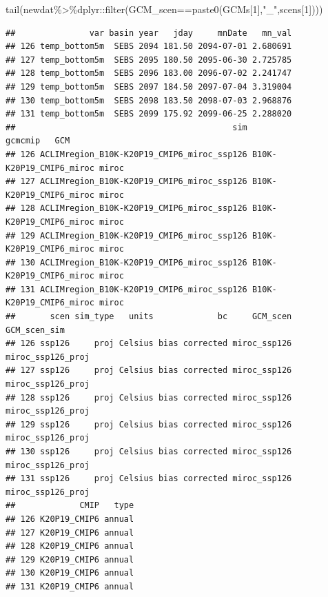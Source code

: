 \documentclass[
]{article}
\newenvironment{Shaded}{\begin{snugshade}}{\end{snugshade}}
\newcommand{\DecValTok}[1]{\textcolor[rgb]{0.00,0.00,0.81}{#1}}
\newcommand{\FunctionTok}[1]{\textcolor[rgb]{0.00,0.00,0.00}{#1}}
\newcommand{\NormalTok}[1]{#1}
\newcommand{\SpecialCharTok}[1]{\textcolor[rgb]{0.00,0.00,0.00}{#1}}
\newcommand{\StringTok}[1]{\textcolor[rgb]{0.31,0.60,0.02}{#1}}
\begin{document}
\begin{Shaded}
\begin{Highlighting}[]
\FunctionTok{tail}\NormalTok{(newdat}\SpecialCharTok{\%\textgreater{}\%}\NormalTok{dplyr}\SpecialCharTok{::}\FunctionTok{filter}\NormalTok{(GCM\_scen}\SpecialCharTok{==}\FunctionTok{paste0}\NormalTok{(GCMs[}\DecValTok{1}\NormalTok{],}\StringTok{"\_"}\NormalTok{,scens[}\DecValTok{1}\NormalTok{])))}
\end{Highlighting}
\end{Shaded}

\begin{verbatim}
##               var basin year   jday     mnDate   mn_val
## 126 temp_bottom5m  SEBS 2094 181.50 2094-07-01 2.680691
## 127 temp_bottom5m  SEBS 2095 180.50 2095-06-30 2.725785
## 128 temp_bottom5m  SEBS 2096 183.00 2096-07-02 2.241747
## 129 temp_bottom5m  SEBS 2097 184.50 2097-07-04 3.319004
## 130 temp_bottom5m  SEBS 2098 183.50 2098-07-03 2.968876
## 131 temp_bottom5m  SEBS 2099 175.92 2099-06-25 2.288020
##                                            sim                 gcmcmip   GCM
## 126 ACLIMregion_B10K-K20P19_CMIP6_miroc_ssp126 B10K-K20P19_CMIP6_miroc miroc
## 127 ACLIMregion_B10K-K20P19_CMIP6_miroc_ssp126 B10K-K20P19_CMIP6_miroc miroc
## 128 ACLIMregion_B10K-K20P19_CMIP6_miroc_ssp126 B10K-K20P19_CMIP6_miroc miroc
## 129 ACLIMregion_B10K-K20P19_CMIP6_miroc_ssp126 B10K-K20P19_CMIP6_miroc miroc
## 130 ACLIMregion_B10K-K20P19_CMIP6_miroc_ssp126 B10K-K20P19_CMIP6_miroc miroc
## 131 ACLIMregion_B10K-K20P19_CMIP6_miroc_ssp126 B10K-K20P19_CMIP6_miroc miroc
##       scen sim_type   units             bc     GCM_scen      GCM_scen_sim
## 126 ssp126     proj Celsius bias corrected miroc_ssp126 miroc_ssp126_proj
## 127 ssp126     proj Celsius bias corrected miroc_ssp126 miroc_ssp126_proj
## 128 ssp126     proj Celsius bias corrected miroc_ssp126 miroc_ssp126_proj
## 129 ssp126     proj Celsius bias corrected miroc_ssp126 miroc_ssp126_proj
## 130 ssp126     proj Celsius bias corrected miroc_ssp126 miroc_ssp126_proj
## 131 ssp126     proj Celsius bias corrected miroc_ssp126 miroc_ssp126_proj
##             CMIP   type
## 126 K20P19_CMIP6 annual
## 127 K20P19_CMIP6 annual
## 128 K20P19_CMIP6 annual
## 129 K20P19_CMIP6 annual
## 130 K20P19_CMIP6 annual
## 131 K20P19_CMIP6 annual
\end{verbatim}
\end{document}
